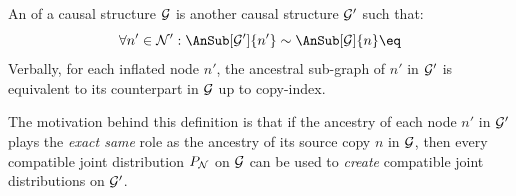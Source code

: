 \documentclass[aps, 10pt, english, twoside, pra, nofootinbib, tightenlines, longbibliography, superscriptaddress]{revtex4-1}
\begin{document}
    \begin{definition}
        An  of a causal structure $\mathcal{G}$ is another causal structure $\mathcal{G}'$ such that:
        \[ \forall n' \in \nodes': \AnSub[\graph']{n'} \sim \AnSub[\graph]{n} \eq \label{eq:inflation_defn}\]
        Verbally, for each inflated node $n'$, the ancestral sub-graph of $n'$ in $\mathcal{G}'$ is equivalent to its counterpart in $\mathcal{G}$ up to copy-index.
    \end{definition}
    The motivation behind this definition is that if the ancestry of each node $n'$ in $\mathcal{G}'$ plays the \textit{exact same} role as the ancestry of its source copy $n$ in $\mathcal{G}$, then every compatible joint distribution $\prob[\nodes]$ on $\mathcal{G}$ can be used to \textit{create} compatible joint distributions on $\mathcal{G}'$.
\end{document}
